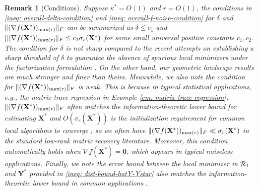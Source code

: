 \documentclass[11pt]{article}
\newtheorem{Remark}{Remark}
\newcommand{\0}{{\mathbf{0}}}
\newcommand{\1}{{\mathbf{1}}}
\newcommand{\X}{{\mathbf{X}}}
\newcommand{\Y}{{\mathbf{Y}}}
\newcommand{\cR}{{\cal R}}
\newcommand{\F}{{\rm F}}
\begin{document}
\begin{Remark}[Conditions] Suppose $\kappa^* = O(1)$ and $ r= O(1)$, the conditions in \eqref{ineq: overall-delta-condition} and \eqref{ineq: overall-f-noise-condition} for $\delta$ and $  \| (\nabla f(\X^*))_{\max(r)} \|_\F$ can be summarized as $\delta \leq c_1$ and $ \| (\nabla f(\X^*))_{\max(r)} \|_\F \leq c_2 \sigma_r(\X^*)$ for some small universal positive constants $c_1, c_2$. The condition for $\delta$ is not sharp compared to the recent attempts on establishing a sharp threshold of $\delta$ to guarantee the absence of spurious local minimizers under the factorization formulation \cite{zhang2019sharp,zhang2021general,ma2022noisy}. On the other hand, our geometric landscape results are much stronger and finer than theirs. Meanwhile, we also note the condition for $  \| (\nabla f(\X^*))_{\max(r)} \|_\F$ is weak. This is because in typical statistical applications, e.g., the matrix trace regression in Example \ref{em: matrix-trace-regression}, $\| (\nabla f(\X^*))_{\max(r)} \|_\F$ often matches the information-theoretic lower bound for estimating $\X^*$ and $O(\sigma_r(\X^*))$ is the initialization requirement for common local algorithms to converge \cite{chen2015fast,luo2020recursive}, so we often have $\| (\nabla f(\X^*))_{\max(r)} \|_\F \ll  \sigma_r(\X^*)$ in the standard low-rank matrix recovery literature. Moreover, this condition automatically holds when $\nabla f(\X^*) = \0$, which appears in typical noiseless applications. Finally, we note the error bound between the local minimizer in $\cR_1$ and $\Y^*$ provided in \eqref{ineq: dist-bound-hatY-Ystar} also matches the information-theoretic lower bound in common applications \cite[Section 4]{chen2015fast}. 
\end{Remark}
\end{document}
